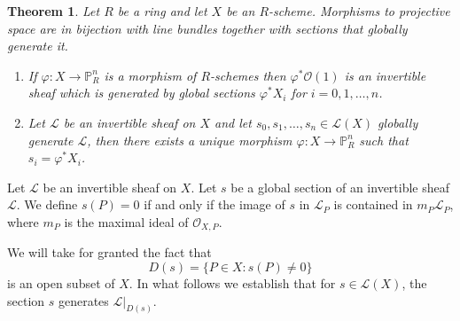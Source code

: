 \documentclass[12pt]{article}
\numberwithin{equation}{section}
\newtheorem{theorem}{Theorem}[subsection]
\theoremstyle{definition}
\theoremstyle{remark}
\newcommand{\Ocal}{\mathcal{O}}
\newcommand{\PP}{\mathbb{P}}
\newcommand{\Lcal}{\mathcal{L}}
\begin{document}
\begin{theorem}\label{thm:maps-to-projective-space}
	Let $R$ be a ring and let $X$ be an $R$-scheme. 
	Morphisms to projective space are in bijection with line bundles together with sections that globally generate it. 
	\begin{enumerate}
		\item If $\varphi:X \to \PP^n_R$ is a morphism of $R$-schemes then $\varphi^* \Ocal(1)$ is an invertible sheaf which is generated by global sections $\varphi^* X_i$ for $i=0,1,\ldots,n$. 
		\item Let $\Lcal$ be an invertible sheaf on $X$ and let $s_0,s_1,\ldots,s_n \in \Lcal(X)$ globally generate $\Lcal$, then there exists a unique morphism $\varphi: X \to \PP^n_R$ such that $s_i = \varphi^*X_i$.
	\end{enumerate}
\end{theorem}

Let $\Lcal$ be an invertible sheaf on $X$. 
Let $s$ be a global section of an invertible sheaf $\Lcal$.	
We define $s(P)=0$ if and only if the image of $s$ in $\Lcal_P$ is contained in $m_P\Lcal_P$, where $m_P$ is the maximal ideal of $\Ocal_{X,P}$.

We will take for granted the fact that 
$$D(s) = \lbrace P \in X \colon s(P)\neq 0 \rbrace $$ 
is an open subset of $X$.
In what follows we establish that for $s \in \Lcal(X)$, the section $s$ generates $\Lcal\vert_{D(s)}$.
\end{document}
